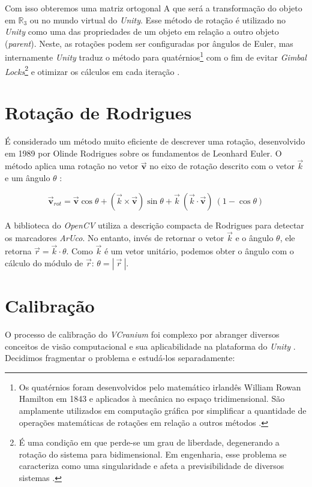 Com isso obteremos uma matriz ortogonal A que será a transformação do objeto em \(\mathbb{R}_3\) ou no mundo virtual do \textit{Unity}. Esse método de rotação é utilizado no \textit{Unity} como uma das propriedades de um objeto em relação a outro objeto (\textit{parent}). Neste, as rotações podem ser configuradas por ângulos de Euler, mas internamente \textit{Unity} traduz o método para quatérnios\footnote[1]{Os quatérnios foram desenvolvidos pelo matemático irlandês William Rowan Hamilton em 1843 e aplicados à mecânica no espaço tridimensional. São amplamente utilizados em computação gráfica por simplificar a quantidade de operações matemáticas de rotações em relação a outros métodos \cite{QuaternionWiki}.} com o fim de evitar \textit{Gimbal Locks}\footnote[2]{É uma condição em que perde-se um grau de liberdade, degenerando a rotação do sistema para bidimensional. Em engenharia, esse problema se caracteriza como uma singularidade e afeta a previsibilidade de diversos sistemas \cite{GimbalWiki}.} e otimizar os cálculos em cada iteração \cite{Quaternion}.

\section{Rotação de Rodrigues}\label{chp:rot}

É considerado um método muito eficiente de descrever uma rotação, desenvolvido em 1989 por Olinde Rodrigues sobre os fundamentos de Leonhard Euler. O método aplica uma rotação no vetor \(\vec{\mathbf{v}}\) no eixo de rotação descrito com o vetor \(\vec{k}\) e um ângulo \(\theta\) \cite{RodriguesWiki}:

\[\vec{\mathbf{v}}_{rot} = \vec{\mathbf{v}} \cos \theta + (\vec{k} \times \vec{\mathbf{v}}) \sin \theta + \vec{k} \ (\vec{k} \cdot \vec{\mathbf{v}}) \ (1 - \cos \theta) \] 

A biblioteca do \textit{OpenCV} utiliza a descrição compacta de Rodrigues para detectar os marcadores \textit{ArUco}. No entanto, invés de retornar o vetor \(\vec{k}\) e o ângulo \(\theta\), ele retorna \( \vec{r} = \vec{k} \cdot \theta\). Como \(\vec{k}\) é um vetor unitário, podemos obter o ângulo com o cálculo do módulo de \(\vec{r}\): \(\theta = |\ \vec{r}\ |\).

\section{Calibração}\label{chp:calibr}

O processo de calibração do \textit{VCranium} foi complexo por abranger diversos conceitos de visão computacional e sua aplicabilidade na plataforma do \textit{Unity} \cite{UnityOficial}. Decidimos fragmentar o problema e estudá-los separadamente:

